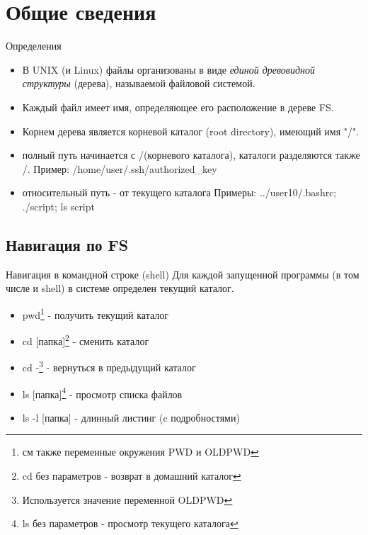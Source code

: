 





\firstframe

\section{Общие сведения}
\begin{frame}{Определения}
  \begin{itemize}
    \item В UNIX (и Linux) файлы организованы в виде \emph{единой древовидной структуры} (дерева), называемой \alert{файловой системой}.
    \item \alert{Каждый файл имеет имя}, определяющее его расположение в дереве FS.
    \item Корнем дерева является \alert{корневой каталог} (root directory), имеющий имя \alert{"/"}.
  \end{itemize} \pause

  \begin{itemize}
    \item \alert{полный путь} начинается с \alert{/}(корневого каталога), каталоги разделяются также \alert{/}. \newline
      Пример: /home/user/.ssh/authorized\_key
    \item \alert{относительный путь} - от текущего каталога \newline
      Примеры: ../user10/.bashrc; ./script; ls script
  \end{itemize}

\end{frame}

\subsection{Навигация по FS}
\begin{frame}{Навигация в командной строке (shell)}
  Для каждой запущенной программы (в том числе и shell) в системе определен \alert{текущий каталог}. 
  \begin{itemize} 
    \item \alert{pwd}\footnote{см также переменные окружения \alert{PWD} и \alert{OLDPWD}} - получить текущий каталог
    \item \alert{cd [папка]}\footnote{\alert{cd} без параметров - возврат в домашний каталог} - сменить каталог
    \item \alert{cd -}\footnote{Используется значение переменной \alert{OLDPWD}} - вернуться в предыдущий каталог
    \item \alert{ls [папка]}\footnote{\alert{ls} без параметров - просмотр текущего каталога} - просмотр списка файлов
    \item \alert{ls -l [папка]} - длинный листинг (c подробностями)
  \end{itemize}
\end{frame}

